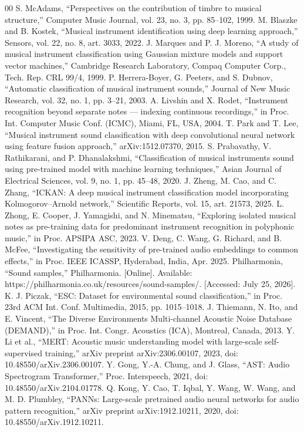 \documentclass[conference]{IEEEtran}
\begin{document}
\begin{thebibliography}{00}
 S. McAdams, ``Perspectives on the contribution of timbre to musical structure,'' Computer Music Journal, vol. 23, no. 3, pp. 85--102, 1999.
 M. Blaszke and B. Kostek, ``Musical instrument identification using deep learning approach,'' Sensors, vol. 22, no. 8, art. 3033, 2022.
 J. Marques and P. J. Moreno, ``A study of musical instrument classification using Gaussian mixture models and support vector machines,'' Cambridge Research Laboratory, Compaq Computer Corp., Tech. Rep. CRL 99/4, 1999.
 P. Herrera-Boyer, G. Peeters, and S. Dubnov, ``Automatic classification of musical instrument sounds,'' Journal of New Music Research, vol. 32, no. 1, pp. 3--21, 2003.
 A. Livshin and X. Rodet, ``Instrument recognition beyond separate notes --- indexing continuous recordings,'' in Proc. Int. Computer Music Conf. (ICMC), Miami, FL, USA, 2004.
 T. Park and T. Lee, ``Musical instrument sound classification with deep convolutional neural network using feature fusion approach,'' arXiv:1512.07370, 2015.
 S. Prabavathy, V. Rathikarani, and P. Dhanalakshmi, ``Classification of musical instruments sound using pre-trained model with machine learning techniques,'' Asian Journal of Electrical Sciences, vol. 9, no. 1, pp. 45--48, 2020.
 J. Zheng, M. Cao, and C. Zhang, ``ICKAN: A deep musical instrument classification model incorporating Kolmogorov--Arnold network,'' Scientific Reports, vol. 15, art. 21573, 2025.
 L. Zhong, E. Cooper, J. Yamagishi, and N. Minematsu, ``Exploring isolated musical notes as pre-training data for predominant instrument recognition in polyphonic music,'' in Proc. APSIPA ASC, 2023.
 V. Deng, C. Wang, G. Richard, and B. McFee, ``Investigating the sensitivity of pre-trained audio embeddings to common effects,'' in Proc. IEEE ICASSP, Hyderabad, India, Apr. 2025.
 Philharmonia, ``Sound samples,'' Philharmonia. [Online]. Available: https://philharmonia.co.uk/resources/sound-samples/. [Accessed: July 25, 2026].
 K. J. Piczak, ``ESC: Dataset for environmental sound classification,'' in Proc. 23rd ACM Int. Conf. Multimedia, 2015, pp. 1015--1018.
 J. Thiemann, N. Ito, and E. Vincent, ``The Diverse Environments Multi-channel Acoustic Noise Database (DEMAND),'' in Proc. Int. Congr. Acoustics (ICA), Montreal, Canada, 2013.
 Y. Li et al., ``MERT: Acoustic music understanding model with large-scale self-supervised training,'' arXiv preprint arXiv:2306.00107, 2023, doi: 10.48550/arXiv.2306.00107.
 Y. Gong, Y.-A. Chung, and J. Glass, ``AST: Audio Spectrogram Transformer,'' Proc. Interspeech, 2021, doi: 10.48550/arXiv.2104.01778.
 Q. Kong, Y. Cao, T. Iqbal, Y. Wang, W. Wang, and M. D. Plumbley, ``PANNs: Large-scale pretrained audio neural networks for audio pattern recognition,'' arXiv preprint arXiv:1912.10211, 2020, doi: 10.48550/arXiv.1912.10211.

\end{thebibliography}
\end{document}
